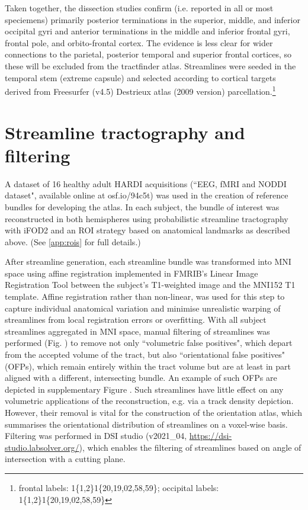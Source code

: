 Taken together, the dissection studies confirm (i.e. reported in all or most speciemens) primarily posterior terminations in the superior, middle, and inferior occipital gyri and anterior terminations in the middle and inferior frontal gyri, frontal pole, and orbito-frontal cortex.
The evidence is less clear for wider connections to the parietal, posterior temporal and superior frontal cortices, so these will be excluded from the tractfinder atlas.
Streamlines were seeded in the temporal stem (extreme capsule) and selected according to cortical targets derived from Freesurfer (v4.5) Destrieux atlas\autocite{Destrieux2010} (2009 version) parcellation.\footnote{frontal labels: 1\{1,2\}1\{20,19,02,58,59\}; occipital labels: 1\{1,2\}1\{20,19,02,58,59\}}

\section{Streamline tractography and filtering}

A dataset of 16 healthy adult HARDI acquisitions (``EEG, fMRI and NODDI dataset",\autocite{Clayden2020} available online at osf.io/94c5t) was used in the creation of reference bundles for developing the atlas.
In each subject, the bundle of interest was reconstructed in both hemispheres using probabilistic streamline tractography with iFOD2 \autocite{Tournier2010} and an ROI strategy based on anatomical landmarks as described above. (See \ref{app:rois} for full details.)

After streamline generation, each streamline bundle was transformed into MNI space using affine registration implemented in FMRIB's Linear Image Registration Tool\autocite{Jenkinson2002} between the subject's T1-weighted image and the MNI152 T1 template.\autocite{Fonov2011}
Affine registration rather than non-linear, was used for this step to capture individual anatomical variation and minimise unrealistic warping of streamlines from local registration errors or overfitting.
With all subject streamlines aggregated in MNI space, manual filtering of streamlines was performed (Fig. ) to remove not only ``volumetric false positives", which depart from the accepted volume of the tract, but also ``orientational false positives" (OFPs), which remain entirely within the tract volume but are at least in part aligned with a different, intersecting bundle.
An example of such OFPs are depicted in supplementary Figure . Such streamlines have little effect on any volumetric applications of the reconstruction, e.g. via a track density depiction.
However, their removal is vital for the construction of the orientation atlas, which summarises the orientational distribution of streamlines on a voxel-wise basis.
Filtering was performed in DSI studio (v2021\_04, \url{https://dsi-studio.labsolver.org/})\autocite{Yeh2021a}, which enables the filtering of streamlines based on angle of intersection with a cutting plane.

